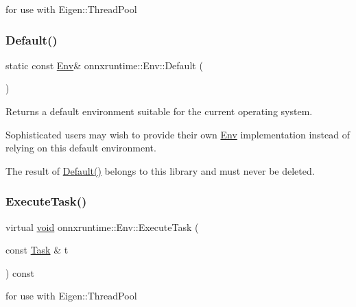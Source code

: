 for use with Eigen\+::\+Thread\+Pool 

\mbox{\label{classonnxruntime_1_1Env_a06e769db78c33a9f62f2440de31d47f5}} 
\subsubsection{\texorpdfstring{Default()}{Default()}}
{\footnotesize\ttfamily static const \mbox{\hyperlink{classonnxruntime_1_1Env}{Env}}\& onnxruntime\+::\+Env\+::\+Default (\begin{DoxyParamCaption}{ }\end{DoxyParamCaption})\hspace{0.3cm}{\ttfamily [static]}}



Returns a default environment suitable for the current operating system. 

Sophisticated users may wish to provide their own \mbox{\hyperlink{classonnxruntime_1_1Env}{Env}} implementation instead of relying on this default environment.

The result of \mbox{\hyperlink{classonnxruntime_1_1Env_a06e769db78c33a9f62f2440de31d47f5}{Default()}} belongs to this library and must never be deleted. \mbox{\label{classonnxruntime_1_1Env_a1270e73cbc0c76b8fc17c71623c065ec}} 
\subsubsection{\texorpdfstring{Execute\+Task()}{ExecuteTask()}}
{\footnotesize\ttfamily virtual \mbox{\hyperlink{mlasi_8h_a88f941d423cb2a819b70a1358982b1a6}{void}} onnxruntime\+::\+Env\+::\+Execute\+Task (\begin{DoxyParamCaption}\item[{const \mbox{\hyperlink{structonnxruntime_1_1Env_1_1Task}{Task}} \&}]{t }\end{DoxyParamCaption}) const\hspace{0.3cm}{\ttfamily [pure virtual]}}



for use with Eigen\+::\+Thread\+Pool 

